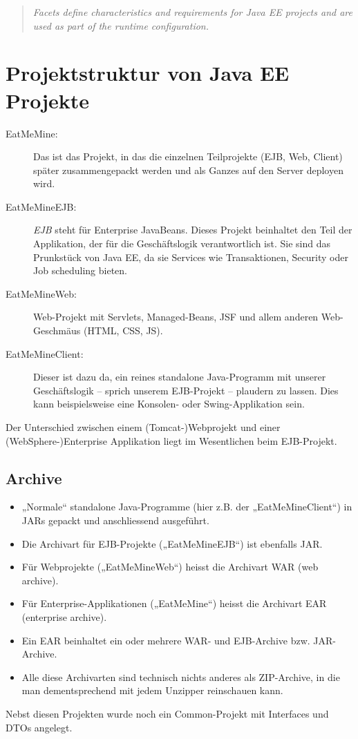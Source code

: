 \begin{quote}
\textit{Facets define characteristics and requirements for Java EE projects and are used as part of the runtime configuration.}
\end{quote}

\section{Projektstruktur von Java EE Projekte}

\begin{description}
	\item[EatMeMine:] Das ist das Projekt, in das die einzelnen Teilprojekte (EJB, Web, Client) später zusammengepackt werden und als Ganzes auf den Server deployen wird.
	
	\item[EatMeMineEJB:] \textit{EJB} steht für Enterprise JavaBeans. Dieses Projekt beinhaltet den Teil der
	Applikation, der für die Geschäftslogik verantwortlich ist. Sie sind das Prunkstück von Java EE, da
	sie Services wie Transaktionen, Security oder Job scheduling bieten.
	
	\item[EatMeMineWeb:] Web-Projekt mit Servlets, Managed-Beans, JSF und allem anderen Web-Geschmäus (HTML, CSS, JS).
	
	\item[EatMeMineClient:] Dieser ist dazu da, ein reines standalone Java-Programm mit unserer	Geschäftslogik – sprich unserem EJB-Projekt – plaudern zu lassen. Dies kann beispielsweise eine Konsolen- oder Swing-Applikation sein.
\end{description}

Der Unterschied zwischen einem (Tomcat-)Webprojekt und einer (WebSphere-)Enterprise Applikation liegt im Wesentlichen beim EJB-Projekt.

\subsection{Archive}

\begin{itemize}
	\item „Normale“ standalone Java-Programme (hier z.B. der „EatMeMineClient“) in JARs gepackt und anschliessend ausgeführt.
	\item Die Archivart für EJB-Projekte („EatMeMineEJB“) ist ebenfalls JAR.
	\item Für Webprojekte („EatMeMineWeb“) heisst die Archivart WAR (web archive).
	\item Für Enterprise-Applikationen („EatMeMine“) heisst die Archivart EAR (enterprise archive).
	\item Ein EAR beinhaltet ein oder mehrere WAR- und EJB-Archive bzw. JAR-Archive.
	\item Alle diese Archivarten sind technisch nichts anderes als ZIP-Archive, in die man dementsprechend mit jedem Unzipper reinschauen kann.
\end{itemize}
Nebst diesen Projekten wurde noch ein Common-Projekt mit Interfaces und DTOs angelegt.


